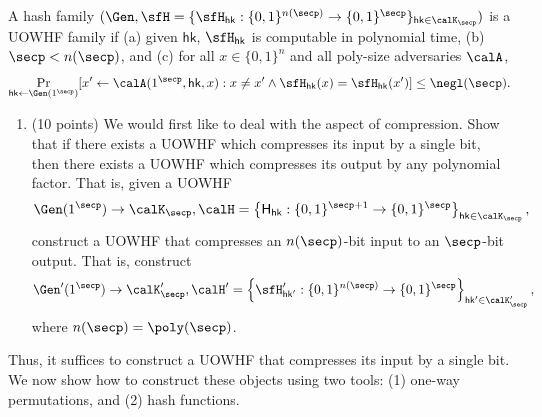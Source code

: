 \documentclass{article}
\newcommand{\hk}{\mathsf{hk}}
\begin{document}
\begin{definition}
	A hash family $(\Gen, \sfH = \{\sfH_{\hk} : \{0, 1\}^{n(\secp)} \to \{0, 1\}^{\secp}\}_{\hk \in \calK_{\secp}})$ is a UOWHF family if (a) given $\hk$, $\sfH_{\hk}$ is computable in polynomial time, (b) $\secp < n(\secp)$, and (c) for all $x \in \{0, 1\}^n$ and all poly-size adversaries $\calA$,
        \[ \Pr_{\hk \gets \Gen(1^{\secp})}[x' \gets \calA(1^{\secp}, \hk, x) : x \neq x' \land \sfH_{\hk}(x) = \sfH_{\hk}(x')] \leq \negl(\secp). \]
\end{definition}
\begin{enumerate}
    \item (10 points) We would first like to deal with the aspect of compression. Show that if there exists a UOWHF which compresses its input by a single bit, then there exists a UOWHF which compresses its output by any polynomial factor. That is, given a UOWHF
        \[ \Gen(1^{\secp}) \to \calK_{\secp}, \calH = \left\{\mathsf{H}_{\hk} : \{0, 1\}^{\secp+1} \rightarrow \{0, 1\}^{\secp} \right\}_{\hk \in \calK_{\secp}}, \]
    construct a UOWHF that compresses an $n(\secp)$-bit input to an $\secp$-bit output. That is, construct
        \[ \Gen'(1^{\secp}) \to \calK'_{\secp}, \calH' = \left\{\sfH'_{\hk'} : \{0, 1\}^{n(\secp)} \rightarrow \{0, 1\}^{\secp} \right\}_{\hk' \in \calK'_{\secp}}, \]
    where $n(\secp) = \poly(\secp)$.
\end{enumerate}

\noindent Thus, it suffices to construct a UOWHF that compresses its input by a single bit. We now show how to construct these objects using two tools: (1) one-way permutations, and (2) hash functions.
\end{document}
